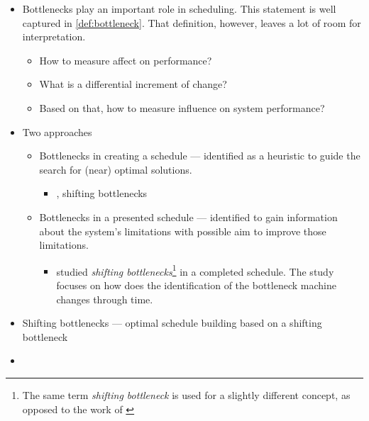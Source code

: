 \begin{itemize}
    \item Bottlenecks play an important role in scheduling. This statement is well captured
        in \cref{def:bottleneck}. That definition, however, leaves a lot of room for interpretation.
        \begin{itemize}
            \item How to measure affect on performance?
            \item What is a differential increment of change?
            \item Based on that, how to measure influence on system performance?
        \end{itemize}

    \item Two approaches
    \begin{itemize}
        \item Bottlenecks in creating a schedule --- identified as a heuristic to guide the search
            for (near) optimal solutions.
        \begin{itemize}
            \item \citet{ADAMS1988}, shifting bottlenecks
        \end{itemize}

        \item Bottlenecks in a presented schedule --- identified to gain information about the system's
            limitations with possible aim to improve those limitations.
        \begin{itemize}
            \item \citet{LAWRENCE1994} studied \emph{shifting bottlenecks}\footnote{The same term
                \emph{shifting bottleneck} is used for a slightly different concept, as opposed to the work
                of \citet{ADAMS1988}} in a completed schedule. The study focuses on how does
                the identification of the bottleneck machine changes through time.

        \end{itemize}
        
    \end{itemize}

    \item Shifting bottlenecks --- optimal schedule building based on a shifting bottleneck
    \item 
\end{itemize}


